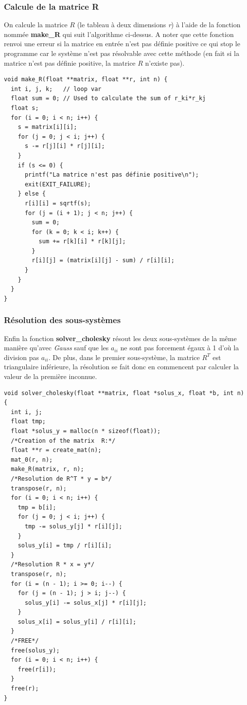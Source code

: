\documentclass[a4paper]{article}
\begin{document}
\clearpage

\subsubsection{Calcule de la matrice R}

On calcule la matrice $R$ (le tableau à deux dimensions \textit{r}) à
l'aide de la fonction nommée \textbf{make\_R} qui suit l'algorithme ci-dessus. A
noter que cette fonction renvoi une erreur si la matrice en entrée n'est pas
définie positive ce qui stop le programme car le système n'est pas résolvable
avec cette méthode (en fait si la matrice n'est pas définie positive, la matrice
$R$ n'existe pas).

\begin{lstlisting}
void make_R(float **matrix, float **r, int n) {
  int i, j, k;   // loop var
  float sum = 0; // Used to calculate the sum of r_ki*r_kj
  float s;
  for (i = 0; i < n; i++) {
    s = matrix[i][i];
    for (j = 0; j < i; j++) {
      s -= r[j][i] * r[j][i];
    }
    if (s <= 0) {
      printf("La matrice n'est pas définie positive\n");
      exit(EXIT_FAILURE);
    } else {
      r[i][i] = sqrtf(s);
      for (j = (i + 1); j < n; j++) {
        sum = 0;
        for (k = 0; k < i; k++) {
          sum += r[k][i] * r[k][j];
        }
        r[i][j] = (matrix[i][j] - sum) / r[i][i];
      }
    }
  }
}
\end{lstlisting}

\subsubsection{Résolution des sous-systèmes}

Enfin la fonction \textbf{solver\_cholesky} résout les deux sous-systèmes de la
même manière qu'avec \textit{Gauss} sauf que les $a_{ii}$ ne sont pas forcement
égaux à 1 d'où la division pas $a_{ii}$. De plus, dans le premier sous-système,
la matrice $R^{T}$ est triangulaire inférieure, la résolution se fait donc en
commencent par calculer la valeur de la première inconnue.

\begin{lstlisting}
void solver_cholesky(float **matrix, float *solus_x, float *b, int n) {
  int i, j;
  float tmp;
  float *solus_y = malloc(n * sizeof(float));
  /*Creation of the matrix  R:*/
  float **r = create_mat(n);
  mat_0(r, n);
  make_R(matrix, r, n);
  /*Resolution de R^T * y = b*/
  transpose(r, n);
  for (i = 0; i < n; i++) {
    tmp = b[i];
    for (j = 0; j < i; j++) {
      tmp -= solus_y[j] * r[i][j];
    }
    solus_y[i] = tmp / r[i][i];
  }
  /*Resolution R * x = y*/
  transpose(r, n);
  for (i = (n - 1); i >= 0; i--) {
    for (j = (n - 1); j > i; j--) {
      solus_y[i] -= solus_x[j] * r[i][j];
    }
    solus_x[i] = solus_y[i] / r[i][i];
  }
  /*FREE*/
  free(solus_y);
  for (i = 0; i < n; i++) {
    free(r[i]);
  }
  free(r);
}
\end{lstlisting}
\end{document}
